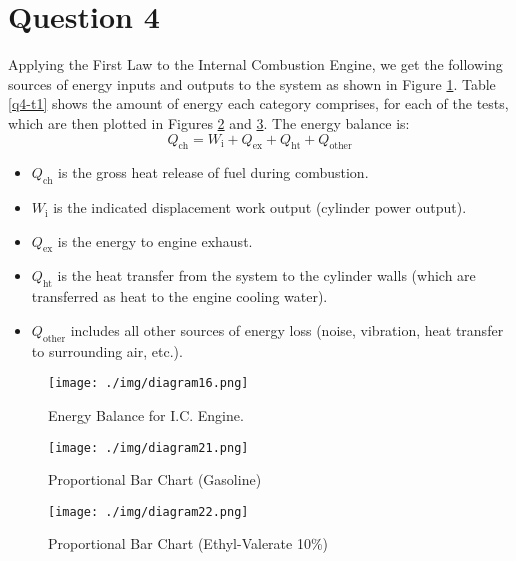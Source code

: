 \section{Question 4}
Applying the First Law to the Internal Combustion Engine, we get the following sources of energy inputs and outputs to the system as shown in Figure \ref{q4-f1}. Table \ref{q4-t1} shows the amount of energy each category comprises, for each of the tests, which are then plotted in Figures \ref{q4-f6} and \ref{q4-f7}. The energy balance is:
\begin{equation}
    Q_\textrm{ch} = W_\textrm{i} + Q_\textrm{ex} + Q_\textrm{ht} + Q_\textrm{other}\label{q4-1}
\end{equation}
\begin{itemize}
    \item $Q_\textrm{ch}$ is the gross heat release of fuel during combustion.
    \item $W_\textrm{i}$ is the indicated displacement work output (cylinder power output).
    \item $Q_\textrm{ex}$ is the energy to engine exhaust.
    \item $Q_\textrm{ht}$ is the heat transfer from the system to the cylinder walls (which are transferred as heat to the engine cooling water).
    \item $Q_\textrm{other}$ includes all other sources of energy loss (noise, vibration, heat transfer to surrounding air, etc.).
\end{itemize}
\begin{figure}[H]
    \centering
    \texttt{[image: ./img/diagram16.png]}
    \caption{Energy Balance for I.C. Engine. \cite{r0}}
    \label{q4-f1}
\end{figure}
\begin{figure}[H]
    \centering
    \texttt{[image: ./img/diagram21.png]}
    \caption{Proportional Bar Chart (Gasoline)}
    \label{q4-f6}
\end{figure}
\begin{figure}[H]
    \centering
    \texttt{[image: ./img/diagram22.png]}
    \caption{Proportional Bar Chart (Ethyl-Valerate 10\%)}
    \label{q4-f7}
\end{figure}
